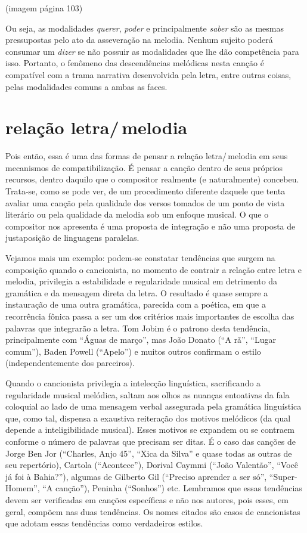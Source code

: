 (imagem página 103)

Ou seja, as modalidades \textit{querer}, \textit{poder} e principalmente \textit{saber}
são as mesmas pressupostas pelo ato da asseveração na melodia. Nenhum
sujeito poderá consumar um \textit{dizer} se não possuir as modalidades que
lhe dão competência para isso. Portanto, o fenômeno das descendências
melódicas nesta canção é compatível com a trama narrativa desenvolvida
pela letra, entre outras coisas, pelas modalidades comuns a ambas as
faces.

\section{relação letra/\,melodia}

Pois então, essa é uma das formas de pensar a relação letra/\,melodia em
seus mecanismos de compatibilização. É pensar a canção dentro de seus
próprios recursos, dentro daquilo que o compositor realmente (e
naturalmente) concebeu. Trata-se, como se pode ver, de um procedimento
diferente daquele que tenta avaliar uma canção pela qualidade dos versos
tomados de um ponto de vista literário ou pela qualidade da melodia sob
um enfoque musical. O que o compositor nos apresenta é uma proposta de
integração e não uma proposta de justaposição de linguagens paralelas.

Vejamos mais um exemplo: podem-se constatar tendências que surgem na
composição quando o cancionista, no momento de contrair a relação entre
letra e melodia, privilegia a estabilidade e regularidade musical em
detrimento da gramática e da mensagem direta da letra. O resultado é
quase sempre a instauração de uma outra gramática, parecida com a
poética, em que a recorrência fônica passa a ser um dos critérios mais
importantes de escolha das palavras que integrarão a letra. Tom Jobim é
o patrono desta tendência, principalmente com ``Águas de março'', mas João
Donato (``A rã'', ``Lugar comum''), Baden Powell (``Apelo'') e muitos outros
confirmam o estilo (independentemente dos parceiros).

Quando o cancionista privilegia a intelecção linguística, sacrificando a
regularidade musical melódica, saltam aos olhos as nuanças entoativas da
fala coloquial ao lado de uma mensagem verbal assegurada pela gramática
linguística que, como tal, dispensa a exaustiva reiteração dos motivos
melódicos (da qual depende a inteligibilidade musical). Esses motivos se
expandem ou se contraem conforme o número de palavras que precisam ser
ditas. É o caso das canções de Jorge Ben Jor (``Charles, Anjo 45'', ``Xica da
Silva'' e quase todas as outras de seu repertório), Cartola (``Acontece''),
Dorival Caymmi (``João Valentão'', ``Você já foi à Bahia?''), algumas de
Gilberto Gil (``Preciso aprender a ser só'', ``Super-Homem'', ``A canção''),
Peninha (``Sonhos'') etc. Lembramos que essas tendências devem ser
verificadas em canções específicas e não nos autores, pois esses, em
geral, compõem nas duas tendências. Os nomes citados são casos de
cancionistas que adotam essas tendências como verdadeiros estilos.

